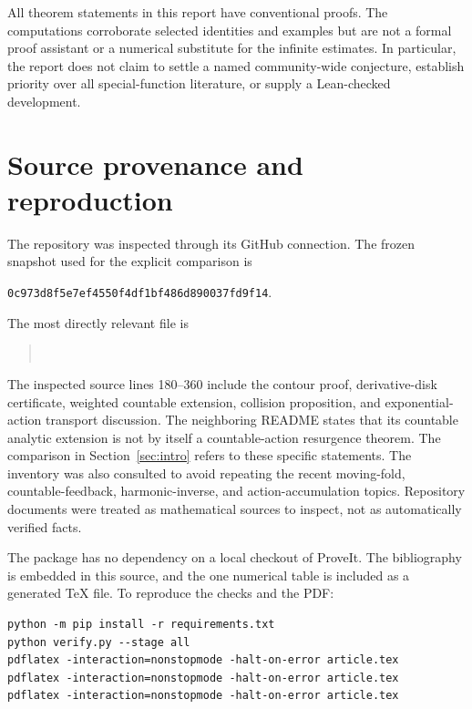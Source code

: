 \documentclass[11pt,a4paper]{article}
\numberwithin{equation}{section}
\theoremstyle{definition}
\theoremstyle{remark}
\begin{document}
All theorem statements in this report have conventional proofs.
The computations corroborate selected identities and examples but are
not a formal proof assistant or a numerical substitute for the infinite
estimates. In particular, the report does not claim to settle a named
community-wide conjecture, establish priority over all special-function
literature, or supply a Lean-checked development.

\section{Source provenance and reproduction}
The repository was inspected through its GitHub connection. The frozen
snapshot used for the explicit comparison is
\begin{center}
\small\texttt{0c973d8f5e7ef4550f4df1bf486d890037fd9f14}.
\end{center}
The most directly relevant file is
\begin{quote}\small
{}\\
\end{quote}
The inspected source lines 180--360 include the contour proof, derivative-disk
certificate, weighted countable extension, collision proposition, and
exponential-action transport discussion. The neighboring README states
that its countable analytic extension is not by itself a countable-action
resurgence theorem. The comparison in Section~\ref{sec:intro} refers to
these specific statements. The inventory was also consulted to avoid
repeating the recent moving-fold, countable-feedback, harmonic-inverse,
and action-accumulation topics. Repository documents were treated as
mathematical sources to inspect, not as automatically verified facts.

The package has no dependency on a local checkout of ProveIt. The
bibliography is embedded in this source, and the one numerical table is
included as a generated TeX file. To reproduce the checks and the PDF:

\noindent\begin{minipage}{\linewidth}
\begin{verbatim}
python -m pip install -r requirements.txt
python verify.py --stage all
pdflatex -interaction=nonstopmode -halt-on-error article.tex
pdflatex -interaction=nonstopmode -halt-on-error article.tex
pdflatex -interaction=nonstopmode -halt-on-error article.tex
\end{verbatim}
\end{minipage}
\end{document}
